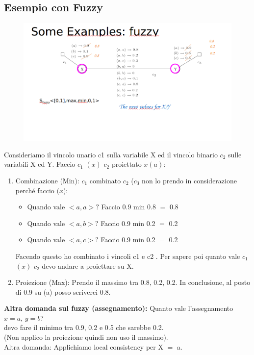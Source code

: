 \subsection{Esempio con Fuzzy}
\begin{figure}[H]
    \centering
    \includegraphics[width=15cm, keepaspectratio]{img/Cap5/ffuzzy2.png}
\end{figure}
Consideriamo il vincolo unario c1 sulla variabile X ed il vincolo binario $c_2$ sulle variabili X ed Y. Faccio $c_1$ $(x)$ $c_2$ proiettato $x(a)$:
\begin{enumerate}
    \item Combinazione (Min): $c_1$ combinato $c_2$ ($c_3$ non lo prendo in considerazione perché faccio $(x$):
          \begin{itemize}
              \item Quando vale $< a, a >?$ Faccio 0.9 min 0.8 $=$ 0.8
              \item Quando vale $< a, b >?$ Faccio 0.9 min 0.2 $=$ 0.2
              \item Quando vale $< a, c >?$ Faccio 0.9 min 0.2 $=$ 0.2
          \end{itemize}
          Facendo questo ho combinato i vincoli c1 e c2 . Per sapere poi quanto vale $c_1$ $(x)$ $c_2$ devo andare a proiettare su X.
    \item Proiezione (Max): Prendo il massimo tra 0.8, 0.2, 0.2. In conclusione, al posto di 0.9 su (a) posso scriverci 0.8.
\end{enumerate}
\textbf{Altra domanda sul fuzzy (assegnamento): } Quanto vale l'assegnamento $x=a$, $y=b$?
\\devo fare il minimo tra 0.9, 0.2 e 0.5 che sarebbe 0.2.
\\(Non applico la proiezione quindi non uso il massimo).
\\Altra domanda: Applichiamo local consistency per X $=$ a.

